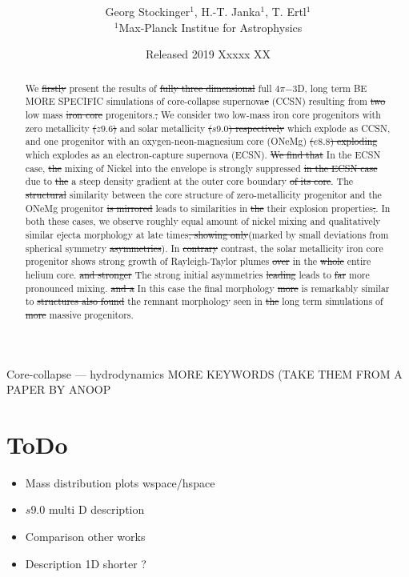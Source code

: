 \documentclass[fleqn,usenatbib]{mnras}
\title{\NY{Low Mass Core Collapse}{ Supernovae} \NY{}{from Low-Mass Progenitors}}
\author[G. Stockinger et. al]{Georg Stockinger$^1$, H.-T. Janka$^1$, T. Ertl$^1$\\
$^1$Max-Planck Institue for Astrophysics}
\date{Released 2019 Xxxxx XX}
\newcommand{\NY}[2]{{\color{blue}\sout{#1}#2}}
\begin{document}
\maketitle
\pagerange{\pageref{firstpage}--\pageref{lastpage}} 

\begin{abstract}
We \NY{firstly}{} present the results of \NY{fully three dimensional}{ full $4\pi\mathord{-}$3D,} long term \NY{}{BE MORE SPECIFIC} simulations of core-collapse supernova\NY{e}{} (CCSN) \NY{}{resulting} from \NY{two}{} low mass \NY{iron core}{} progenitors.\NY{,}{} \NY{}{We consider two low-mass iron core progenitors} with zero \NY{}{metallicity} \NY{($z9.6$)}{ and} solar metallicity \NY{($s9.0$) respectively}{ which explode as CCSN}, and one progenitor with an oxygen-neon-magnesium core \NY{}{(ONeMg)} \NY{($e8.8$) exploding}{ which explodes} as an electron-capture supernova (ECSN). \NY{We find that}{ In the ECSN case,} \NY{the}{} mixing of Nickel into the envelope is strongly suppressed \NY{in the ECSN case}{} due to \NY{the}{ a} steep density gradient at the outer \NY{}{core} boundary \NY{of its core}{}. The \NY{structural}{} similarity between the \NY{}{core structure of} zero-metallicity progenitor and the ONeMg progenitor \NY{is mirrored}{ leads to similarities} in \NY{the}{ their} explosion properties\NY{,}{.} \NY{}{In both these cases, we observe roughly equal} amount of nickel mixing and \NY{}{qualitatively similar}{} ejecta morphology at late times\NY{, showing only}{(marked by} small \NY{}{deviations from spherical symmetry} \NY{asymmetries}{)}. In \NY{contrary}{ contrast,} the solar metallicity iron core progenitor shows strong growth of Rayleigh-Taylor plumes \NY{over}{ in} the \NY{whole}{ entire} helium core\NY{}{.} \NY{and stronger}{ The strong} initial asymmetries \NY{leading}{ leads} to \NY{far}{} more pronounced mixing\NY{}{.} \NY{and a}{ In this case the} final morphology \NY{more}{ is remarkably} similar to \NY{structures also found}{ the remnant morphology seen in} \NY{the}{} long term simulation\NY{}{s} of \NY{more}{} massive progenitors. 

\end{abstract}

\begin{keywords}
Core-collapse --- hydrodynamics
\NY{}{MORE KEYWORDS (TAKE THEM FROM A PAPER BY ANOOP}
\end{keywords}
\noindent

\section{ToDo}
\begin{itemize}
    \item Mass distribution plots wspace/hspace
    \item $s9.0$ multi D description
    \item Comparison other works
    \item Description 1D shorter ?
\end{itemize}
\end{document}
